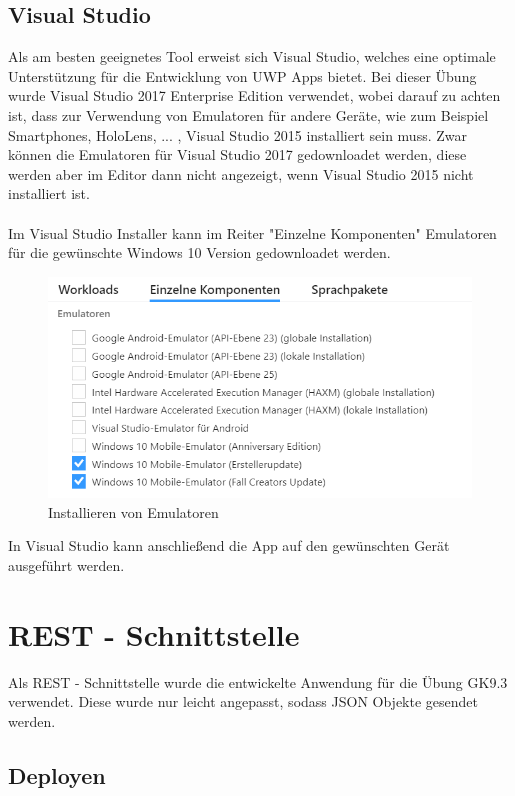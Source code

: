 \subsection{Visual Studio}

Als am besten geeignetes Tool erweist sich Visual Studio, welches eine optimale Unterstützung für die Entwicklung von UWP Apps bietet. Bei dieser Übung wurde Visual Studio 2017 Enterprise Edition verwendet, wobei darauf zu achten ist, dass zur Verwendung von Emulatoren für andere Geräte, wie zum Beispiel Smartphones, HoloLens, ... , Visual Studio 2015 installiert sein muss. Zwar können die Emulatoren für Visual Studio 2017 gedownloadet werden, diese werden aber im Editor dann nicht angezeigt, wenn Visual Studio 2015 nicht installiert ist.
\\\\
Im Visual Studio Installer kann im Reiter "Einzelne Komponenten" Emulatoren für die gewünschte Windows 10 Version gedownloadet werden.

\begin{figure}
	\centering
	\includegraphics[width=0.7\linewidth]{images/screenshot002}
	\caption{Installieren von Emulatoren}
	\label{fig:screenshot002}
\end{figure}

In Visual Studio kann anschließend die App auf den gewünschten Gerät ausgeführt werden.

\section{REST - Schnittstelle}

Als REST - Schnittstelle wurde die entwickelte Anwendung für die Übung GK9.3 verwendet. Diese wurde nur leicht angepasst, sodass JSON Objekte gesendet werden.

\subsection{Deployen}

